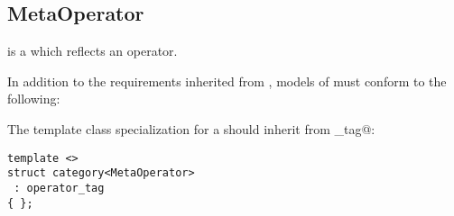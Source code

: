 \subsection{MetaOperator}
\label{concept-MetaOperator}


 is a  which reflects an operator.

In addition to the requirements inherited from ,
models of  must conform to the following:

The \verb@category@ template class specialization for a  should
inherit from \verb@operator_tag@:

\begin{verbatim}
template <>
struct category<MetaOperator>
 : operator_tag
{ };
\end{verbatim}

